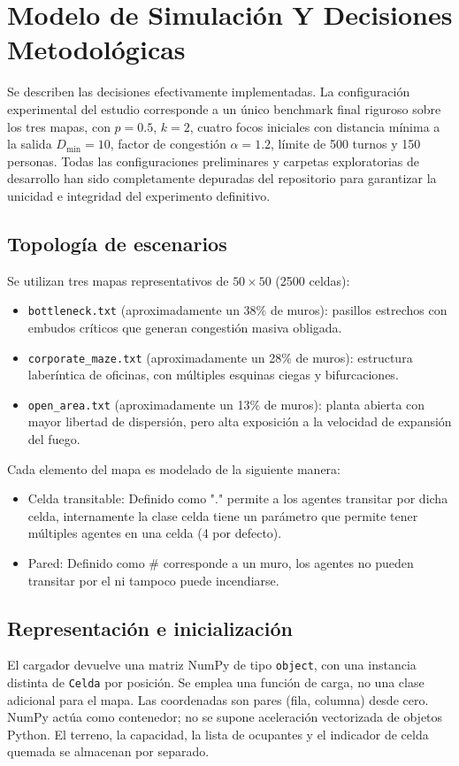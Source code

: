 \documentclass[11pt,letterpaper]{article}
\begin{document}
\newpage

\section{Modelo de Simulación Y Decisiones Metodológicas}

Se describen las decisiones efectivamente implementadas. La configuración experimental del estudio corresponde a un único benchmark final riguroso sobre los tres mapas, con $p=0.5$, $k=2$, cuatro focos iniciales con distancia mínima a la salida $D_{\min}=10$, factor de congestión $\alpha=1.2$, límite de 500 turnos y 150 personas. Todas las configuraciones preliminares y carpetas exploratorias de desarrollo han sido completamente depuradas del repositorio para garantizar la unicidad e integridad del experimento definitivo.

\subsection{Topología de escenarios}
Se utilizan tres mapas representativos de $50 \times 50$ (2500 celdas):

\begin{itemize}
    \item \texttt{bottleneck.txt} (aproximadamente un 38\% de muros): pasillos estrechos con embudos críticos que generan congestión masiva obligada.
    \item \texttt{corporate\_maze.txt} (aproximadamente un 28\% de muros): estructura laberíntica de oficinas, con múltiples esquinas ciegas y bifurcaciones.
    \item \texttt{open\_area.txt} (aproximadamente un 13\% de muros): planta abierta con mayor libertad de dispersión, pero alta exposición a la velocidad de expansión del fuego.
\end{itemize}

Cada elemento del mapa es modelado de la siguiente manera:
\begin{itemize}
    \item Celda transitable: Definido como "." permite a los agentes transitar por dicha celda, internamente la clase celda tiene un parámetro que permite tener múltiples agentes en una celda (4 por defecto).
    \item Pared: Definido como $\#$ corresponde a un muro, los agentes no pueden transitar por el ni tampoco puede incendiarse.
\end{itemize}

\subsection{Representación e inicialización}
El cargador devuelve una matriz NumPy de tipo \texttt{object}, con una instancia distinta de \texttt{Celda} por posición. Se emplea una función de carga, no una clase adicional para el mapa. Las coordenadas son pares (fila, columna) desde cero. NumPy actúa como contenedor; no se supone aceleración vectorizada de objetos Python. El terreno, la capacidad, la lista de ocupantes y el indicador de celda quemada se almacenan por separado.
\end{document}
